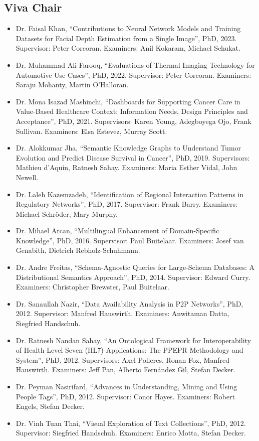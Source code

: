 \documentclass[10pt,a4paper]{res} %
\begin{document}
\begin{resume}
\subsection*{Viva Chair}

\begin{itemize} \itemsep -2pt
\item Dr. Faisal Khan, ``Contributions to Neural Network Models and Training Datasets for Facial Depth Estimation from a Single Image'', PhD, 2023. Supervisor: Peter Corcoran. Examiners: Anil Kokaram, Michael Schukat. %
\item Dr. Muhammad Ali Farooq, ``Evaluations of Thermal Imaging Technology for Automotive Use Cases'', PhD, 2022. Supervisor: Peter Corcoran. Examiners: Saraju Mohanty, Martin O'Halloran. %
\item Dr. Mona Isazad Mashinchi, ``Dashboards for Supporting Cancer Care in Value-Based Healthcare Context: Information Needs, Design Principles and Acceptance'', PhD, 2021. Supervisors: Karen Young, Adegboyega Ojo, Frank Sullivan. Examiners: Elsa Estevez, Murray Scott.
\item Dr. Alokkumar Jha, ``Semantic Knowledge Graphs to Understand Tumor Evolution and Predict Disease Survival in Cancer'', PhD, 2019. Supervisors: Mathieu d'Aquin, Ratnesh Sahay. Examiners: Maria Esther Vidal, John Newell.
\item Dr. Laleh Kazemzadeh, ``Identification of Regional Interaction Patterns in Regulatory Networks'', PhD, 2017. Supervisor: Frank Barry. Examiners: Michael Schr\"{o}der, Mary Murphy.
\item Dr. Mihael Arcan, ``Multilingual Enhancement of Domain-Specific Knowledge'', PhD, 2016. Supervisor: Paul Buitelaar. Examiners: Josef van Genabith, Dietrich Rebholz-Schuhmann.
\item Dr. Andre Freitas, ``Schema-Agnostic Queries for Large-Schema Databases: A Distributional Semantics Approach'', PhD, 2014. Supervisor: Edward Curry. Examiners: Christopher Brewster, Paul Buitelaar.
\item Dr. Sanaullah Nazir, ``Data Availability Analysis in P2P Networks'', PhD, 2012. Supervisor: Manfred Hauswirth. Examiners: Anwitaman Datta, Siegfried Handschuh.
\item Dr. Ratnesh Nandan Sahay, ``An Ontological Framework for Interoperability of Health Level Seven (HL7) Applications: The PPEPR Methodology and System'', PhD, 2012. Supervisors: Axel Polleres, Ronan Fox, Manfred Hauswirth. Examiners: Jeff Pan, Alberto Fern\'{a}ndez Gil, Stefan Decker.
\item Dr. Peyman Nasirifard, ``Advances in Understanding, Mining and Using People Tags'', PhD, 2012. Supervisor: Conor Hayes. Examiners: Robert Engels, Stefan Decker.
\item Dr. Vinh Tuan Thai, ``Visual Exploration of Text Collections'', PhD, 2012. Supervisor: Siegfried Handschuh. Examiners: Enrico Motta, Stefan Decker.
\end{itemize}


\end{resume}
\end{document}

